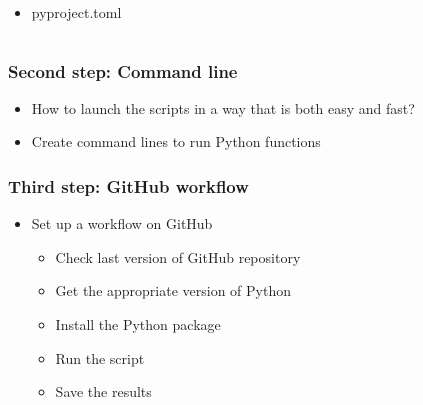 \documentclass{beamer}
\begin{document}
\begin{frame}
{\begin{columns}[c]
\begin{column}{5cm}
\begin{itemize}
					\item pyproject.toml
				\end{itemize}
			\end{column}
		\end{columns}
		}
	\end{frame}

	\begin{frame}
		\frametitle{Second step: Command line}
		\begin{itemize}
			\item How to launch the scripts in a way that is both easy and fast?
			\item Create command lines to run Python functions
		\end{itemize}
	\end{frame}

	\begin{frame}
		\frametitle{Third step: GitHub workflow}
		\begin{itemize}
			\item Set up a workflow on GitHub
			\begin{itemize}
				\item Check last version of GitHub repository
				\item Get the appropriate version of Python
				\item Install the Python package
				\item Run the script
				\item Save the results
			\end{itemize}
		\end{itemize}		
	\end{frame}
\end{document}
